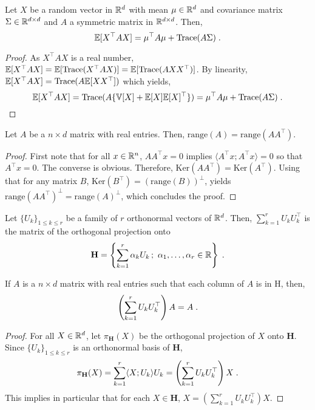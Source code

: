 \begin{shaded}
\begin{lemma}
\label{ref:expectation:quadratic:trasform}
Let $X$ be a random vector in $\mathbb{R}^d$ with mean $\mu\in\mathbb{R}^d$ and covariance matrix $\Sigma\in\mathbb{R}^{d\times d}$ and $A$ a symmetric matrix in $\mathbb{R}^{d\times d}$. Then,
$$
\mathbb{E}[X^\top A X] = \mu^\top A \mu + \mathrm{Trace}(A\Sigma)\;.
$$
\end{lemma}
\end{shaded}
\begin{proof}
As $X^\top A X$ is a real number, $\mathbb{E}[X^\top A X] = \mathbb{E}[\mathrm{Trace}(X^\top A X)] =  \mathbb{E}[\mathrm{Trace}(AXX^\top )]$. By linearity, $\mathbb{E}[X^\top A X] = \mathrm{Trace}(A\mathbb{E}[XX^\top])$ which yields,
$$
\mathbb{E}[X^\top A X] =   \mathrm{Trace}(A\{\mathbb{V}[X] + \mathbb{E}[X]\mathbb{E}[X]^\top\}) =  \mu^\top A \mu + \mathrm{Trace}(A\Sigma)\;.
$$
\end{proof}

\begin{lemma}
\label{lem:im:transpose}
Let $A$ be a $n\times d$ matrix with real entries. Then, $\mathrm{range}(A)=\mathrm{range}(A A^\top)$.
\end{lemma}
\begin{proof}
First note that for all $x\in\mathbb{R}^n$, $AA^\top x=0$ implies $\langle A^\top x; A^\top x\rangle=0$ so that $A^\top x=0$. The converse is obvious. Therefore, $\mathrm{Ker}(A A^\top)= \mathrm{Ker}(A^\top)$. Using that for any matrix $B$, $\mathrm{Ker}(B^\top)=(\mathrm{range}(B))^\perp$, yields $\mathrm{range}(A A^\top)^\perp=\mathrm{range}(A)^\perp$, which concludes the proof.
\end{proof}

\begin{lemma}
\label{lem:ortho:proj}
Let $\{U_k\}_{1\leqslant k \leqslant r}$ be a family of $r$ orthonormal vectors of $\mathbb{R}^d$.
Then, $\sum_{k=1}^{r} U_k U_k^\top$ is the matrix of the orthogonal projection onto 
$$
\mathbf{H}=\left\{\sum_{k=1}^r \alpha_k U_k\,; \ \alpha_1,\ldots,\alpha_r \in \rset\right\}\eqsp.
$$ 
\end{lemma}
\begin{remark}
If $A$ is a $n\times d$ matrix with real entries such that each column of $A$ is in $\mathrm{H}$, then,
$$
\left(\sum_{k=1}^r U_k U_k^\top\right) A = A\;.
$$
\end{remark}
\begin{proof}
For all $X\in\mathbb{R}^d$, let $\pi_\mathbf{H}(X)$ be the orthogonal projection of $X$ onto $\mathbf{H}$. Since $\{U_k\}_{1\leqslant k \leqslant r}$  is an orthonormal basis of $\mathbf{H}$,
$$
\pi_\mathbf{H}(X)=\sum_{k=1}^{r} \langle X; U_k\rangle U_k=\left(\sum_{k=1}^{r} U_k U_k^\top\right)X\;.
$$
This implies in particular that for each $X \in \mathbf{H}$, $X=\left(\sum_{k=1}^{r} U_k U_k^\top\right)X$. %
\end{proof}

